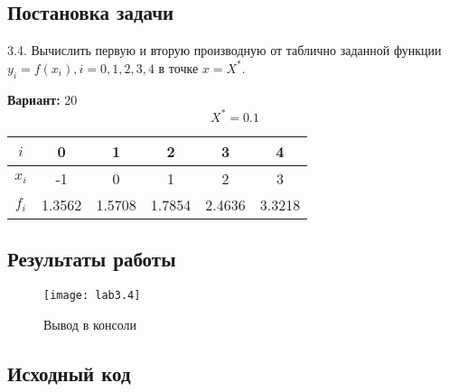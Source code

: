 \subsection{Постановка задачи}
3.4. Вычислить первую и вторую производную от таблично заданной функции $y_i = f(x_i), i = 0,1,2,3,4$ в точке $x= X^*$.  

{\bfseries Вариант:} 20
    \begin{equation}
		X^*=0.1
    \end{equation}
    \begin{center}
        \begin{tabular}{ |c|c|c|c|c|c| } 
			 \hline
			 $i$ & 0 & 1 & 2 & 3 & 4 \\ 
			 \hline
			 $x_i$ & -1 & 0 & 1 & 2 & 3 \\ 
			 \hline
			 $f_i$ & 1.3562 & 1.5708 & 1.7854 & 2.4636 & 3.3218 \\ 
			 \hline
        \end{tabular}
    \end{center}
\pagebreak

\subsection{Результаты работы}
\begin{figure}[h!]
\centering
\texttt{[image: lab3.4]}
\caption{Вывод в консоли}
\end{figure}


\subsection{Исходный код}

\pagebreak